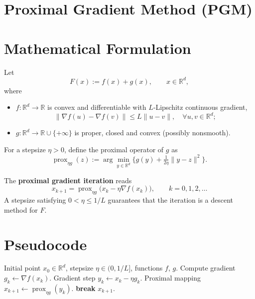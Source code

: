 \documentclass{article}
\begin{document}
\section*{Proximal Gradient Method (PGM)}

\section*{Mathematical Formulation}
Let 
\[
F(x):=f(x)+g(x),\qquad x\in\mathbb{R}^{d},
\]
where  

\begin{itemize}
    \item $f:\mathbb{R}^{d}\!\to\!\mathbb{R}$ is convex and differentiable with $L$‑Lipschitz continuous gradient,
    \[
        \|\nabla f(u)-\nabla f(v)\|\le L\|u-v\|,\quad\forall u,v\in\mathbb{R}^{d};
    \]
    \item $g:\mathbb{R}^{d}\!\to\!\mathbb{R}\cup\{+\infty\}$ is proper, closed and convex (possibly nonsmooth).
\end{itemize}
For a stepsize $\eta>0$, define the proximal operator of $g$ as  
\[
\operatorname{prox}_{\eta g}(z):=\arg\min_{y\in\mathbb{R}^{d}}\Big\{g(y)+\tfrac{1}{2\eta}\|y-z\|^{2}\Big\}.
\]

The \textbf{proximal gradient iteration} reads
\begin{equation}
\boxed{
x_{k+1}= \operatorname{prox}_{\eta g}\!\bigl(x_{k}-\eta\nabla f(x_{k})\bigr),\qquad k=0,1,2,\dots
}
\label{eq:update}
\end{equation}
A stepsize satisfying $0<\eta\le 1/L$ guarantees that the iteration is a descent method for $F$.

\section*{Pseudocode}
\begin{algorithm}[H]
\caption{Proximal Gradient Method}
\begin{algorithmic}[1]
\Require Initial point $x_{0}\in\mathbb{R}^{d}$, stepsize $\eta\in(0,1/L]$,
        functions $f$, $g$.
    \State Compute gradient $g_{k}\gets \nabla f(x_{k})$.
    \State Gradient step $y_{k}\gets x_{k}-\eta g_{k}$.
    \State Proximal mapping $x_{k+1}\gets \operatorname{prox}_{\eta g}(y_{k})$.
        \State \textbf{break}
    \EndIf
\EndFor
\State \Return $x_{k+1}$.
\end{algorithmic}
\end{algorithm}
\end{document}
